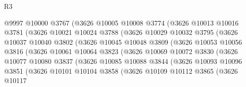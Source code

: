 \begin{lexlean}{R3}
\begin{coremodule}
                      @9997
                      @10000
                      @3767
                      (@3626
                        @10005
                        @10008
                        @3774
                        (@3626
                          @10013
                          @10016
                          @3781
                          (@3626
                            @10021
                            @10024
                            @3788
                            (@3626
                              @10029
                              @10032
                              @3795
                              (@3626
                                @10037
                                @10040
                                @3802
                                (@3626
                                  @10045
                                  @10048
                                  @3809
                                  (@3626
                                    @10053
                                    @10056
                                    @3816
                                    (@3626
                                      @10061
                                      @10064
                                      @3823
                                      (@3626
                                        @10069
                                        @10072
                                        @3830
                                        (@3626
                                          @10077
                                          @10080
                                          @3837
                                          (@3626
                                            @10085
                                            @10088
                                            @3844
                                            (@3626
                                              @10093
                                              @10096
                                              @3851
                                              (@3626
                                                @10101
                                                @10104
                                                @3858
                                                (@3626
                                                  @10109
                                                  @10112
                                                  @3865
                                                  (@3626
                                                    @10117

\end{coremodule}
\end{lexlean}

